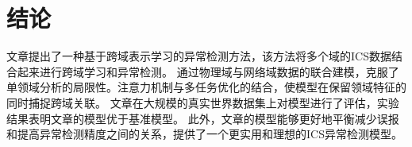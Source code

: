 \section{结论}

文章提出了一种基于跨域表示学习的异常检测方法，该方法将多个域的ICS数据结合起来进行跨域学习和异常检测。
通过物理域与网络域数据的联合建模，克服了单领域分析的局限性。注意力机制与多任务优化的结合，使模型在保留领域特征的同时捕捉跨域关联。
文章在大规模的真实世界数据集上对模型进行了评估，实验结果表明文章的模型优于基准模型。
此外，文章的模型能够更好地平衡减少误报和提高异常检测精度之间的关系，提供了一个更实用和理想的ICS异常检测模型。
